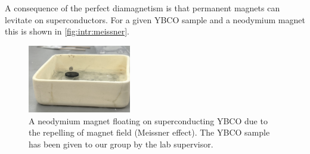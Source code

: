 A consequence of the perfect diamagnetism is that permanent magnets can levitate on superconductors.
For a given YBCO sample and a neodymium magnet this is shown in \autoref{fig:intr:meissner}.

\begin{figure}
  \centering
  \includegraphics[width=0.4\textwidth]{media/meissner.jpg}
  \caption{A neodymium magnet floating on superconducting YBCO due to the repelling of magnet field
  (Meissner effect). The YBCO sample has been given to our group by the lab supervisor.}
  \label{fig:intr:meissner}
\end{figure}

